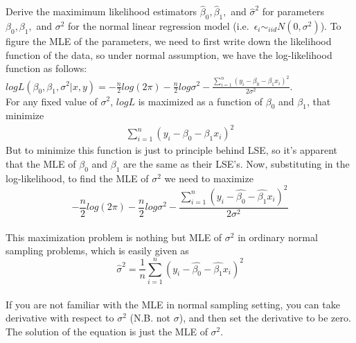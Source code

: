 \documentclass[12pt]{article}
\begin{document}
{
Derive the maximimum likelihood estimators $\hat \beta_0, \hat \beta_1,$ and $\hat \sigma^2$ for parameters $\beta_0, \beta_1,$ and $\sigma^2$ for the normal linear regression model (i.e.~$\epsilon_i \sim_{iid} N(0,\sigma^2)$).
}
{
\vfill
  \answer
}
{
To figure the MLE of the parameters, we need to first write down
the likelihood function of the data, so under normal assumption, we
have the log-likelihood function as follows:\\
$logL(\beta_0,\beta_1,\sigma^2|x,y)=-\frac{n}{2}log(2\pi)-\frac{n}{2}log\sigma^2-\frac{\displaystyle\sum_{i=1}^{n}(y_i-\beta_0-\beta_1x_i)^2}{2\sigma^2}.$\\
For any fixed value of $\sigma^2$, $logL$ is maximized as a function
of $\beta_0$ and $\beta_1$, that minimize
\begin{eqnarray}
\displaystyle\sum_{i=1}^{n}(y_i-\beta_0-\beta_1x_i)^2
\end{eqnarray}
But to minimize this function is just to principle behind LSE, so
it's apparent that the MLE of $\beta_0$ and $\beta_1$ are the same
as their LSE's. Now, substituting in the log-likelihood, to find the
MLE of $\sigma^2$ we need to maximize\\
\[-\frac{n}{2}log(2\pi)-\frac{n}{2}log\sigma^2-\frac{\displaystyle\sum_{i=1}^{n}(y_i-\hat{\beta_0}-\hat{\beta_1}x_i)^2}{2\sigma^2}\]\\
This maximization problem is nothing but MLE of $\sigma^2$ in
ordinary normal sampling problems, which is easily given as\\
\[\hat{\sigma}^2=\frac{1}{n}\displaystyle\sum_{i=1}^{n}(y_i-\hat{\beta_0}-\hat{\beta_1}x_i)^2\]\\
If you are not familiar with the MLE in normal sampling setting, you
can take derivative with respect to $\sigma^2$ (N.B. not $\sigma$),
and then set the derivative to be zero. The solution of the equation
is just the MLE of $\sigma^2$.\\
}
\end{document}
